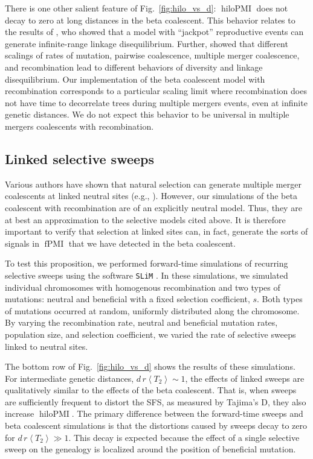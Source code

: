\documentclass[11pt, letterpaper]{article}   	%
\newcommand{\fig}[1]{Fig.~\ref{#1}}
\newcommand{\E}[1]{\left< #1 \right>}
\DeclareMathOperator{\fpmi}{fPMI}
\DeclareMathOperator{\hilopmi}{hiloPMI}
\begin{document}
There is one other salient feature of \fig{fig:hilo_vs_d}: $\hilopmi$ does not decay to zero at long distances in the beta coalescent.
This behavior relates to the results of \textcite{EldonWakeley2006}, who showed that a model with ``jackpot'' reproductive events can generate infinite-range linkage disequilibrium.
Further, \textcite{EldonWakeley2006} showed that different scalings of rates of mutation, pairwise coalescence, multiple merger coalescence, and recombination lead to different behaviors of diversity and linkage disequilibrium.
Our implementation of the beta coalescent model with recombination corresponds to a particular scaling limit where recombination does not have time to decorrelate trees during multiple mergers events, even at infinite genetic distances.
We do not expect this behavior to be universal in multiple mergers coalescents with recombination.

\subsection*{Linked selective sweeps}

Various authors have shown that natural selection can generate multiple merger coalescents at linked neutral sites (e.g., \cite{DurrettSchweinsberg2005, CoopRalph2012, NeherHallatschek2013, DesaiEtAl2013, SegerEtAl2010}).
However, our simulations of the beta coalescent with recombination are of an explicitly neutral model.
Thus, they are at best an approximation to the selective models cited above.
It is therefore important to verify that selection at linked sites can, in fact, generate the sorts of signals in $\fpmi$ that we have detected in the beta coalescent.

To test this proposition, we performed forward-time simulations of recurring selective sweeps using the software \texttt{SLiM} \autocite{Messer2013}.
In these simulations, we simulated individual chromosomes with homogenous recombination and two types of mutations: neutral and beneficial with a fixed selection coefficient, $s$.
Both types of mutations occurred at random, uniformly distributed along the chromosome.
By varying the recombination rate, neutral and beneficial mutation rates, population size, and selection coefficient, we varied the rate of selective sweeps linked to neutral sites.

The bottom row of \fig{fig:hilo_vs_d} shows the results of these simulations.
For intermediate genetic distances, $d\,r \E{T_2} \sim 1$, the effects of linked sweeps are qualitatively similar to the effects of the beta coalescent.
That is, when sweeps are sufficiently frequent to distort the SFS, as measured by Tajima's D, they also increase $\hilopmi$.
The primary difference between the forward-time sweeps and beta coalescent simulations is that the distortions caused by sweeps decay to zero for $d\,r \E{T_2} \gg 1$.
This decay is expected because the effect of a single selective sweep on the genealogy is localized around the position of beneficial mutation.
\end{document}
